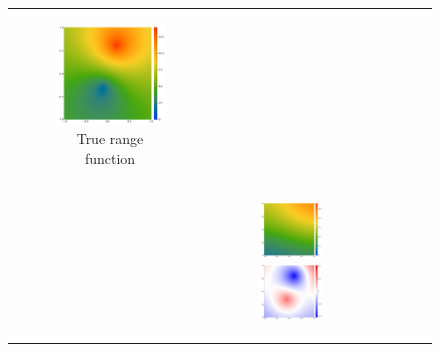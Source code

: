 \documentclass{article}
\numberwithin{equation}{section}
\begin{document}
\begin{figure}[t!]
\begin{tabular}{ccc}
\begin{subfigure}[t]{0.3\textwidth}
      \includegraphics[width=\textwidth]{figures/isotropic/tru-nsr-p10000.pdf}
      \caption{True range function}
    \end{subfigure}
    & \\[4ex]
    &
    \multicolumn{2}{l}{
      \begin{subfigure}[t]{0.6\textwidth}
        \includegraphics[width=0.5\textwidth]{figures/isotropic/est-nsr-p10000-a4.pdf}%
        \includegraphics[width=0.5\textwidth]{figures/isotropic/err-nsr-p10000-a4.pdf}

\end{subfigure}}
\end{tabular}
\end{figure}
\end{document}
